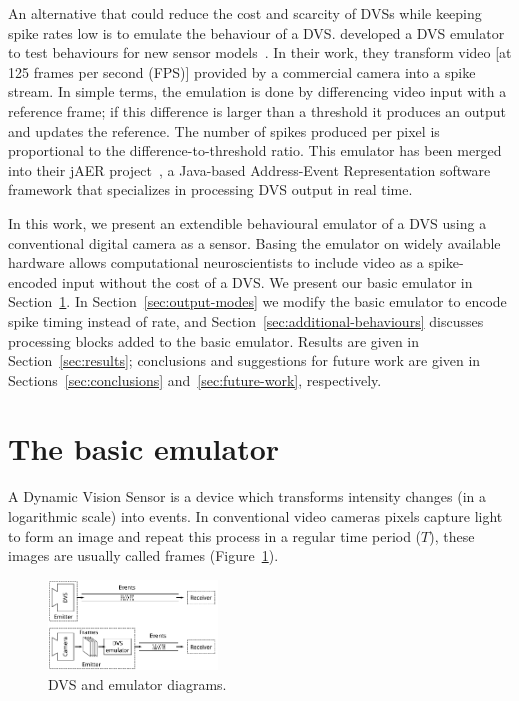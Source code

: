 \documentclass[conference]{IEEEtran}
\begin{document}
An alternative that could reduce the cost and scarcity of DVSs while keeping spike rates low is to emulate the behaviour of a DVS. \citeauthor{DVSemu} developed a DVS emulator to test behaviours for new sensor models~\cite{DVSemu}. In their work, they transform video [at 125 frames per second (FPS)] provided by a commercial camera into a spike stream. In simple terms, the emulation is done by differencing video input with a reference frame; if this difference is larger than a threshold it produces an output and updates the reference. The number of spikes produced per pixel is proportional to the difference-to-threshold ratio. This emulator has been merged into their jAER project~\cite{delbruck2008frame}, a Java-based Address-Event Representation software framework that specializes in processing DVS output in real time.

In this work, we present an extendible behavioural emulator of a DVS using a conventional digital camera as a sensor. Basing the emulator on widely available hardware allows computational neuroscientists to include video as a spike-encoded input without the cost of a DVS. We present our basic emulator in Section~\ref{sec:basic-emulator}. In Section~\ref{sec:output-modes} we modify  the basic emulator to encode spike timing instead of rate, and Section~\ref{sec:additional-behaviours} discusses processing blocks added to the basic emulator. Results are given in Section~\ref{sec:results}; conclusions and suggestions for future work are given in Sections~\ref{sec:conclusions} and~\ref{sec:future-work}, respectively.


\section{The basic emulator}
\label{sec:basic-emulator}
A Dynamic Vision Sensor is a device which transforms intensity changes (in a logarithmic scale) into events. In conventional video cameras pixels capture light to form an image and repeat this process in a regular time period ($T$), these images are usually called frames (Figure~\ref{fig:dvs_vs_emu}).

\begin{figure}[htb]
  \centering
  \includegraphics[width=0.4\textwidth]{dvs_vs_emu_diagram}
  \caption{DVS and emulator diagrams.}
  \label{fig:dvs_vs_emu}
\end{figure}
\end{document}
